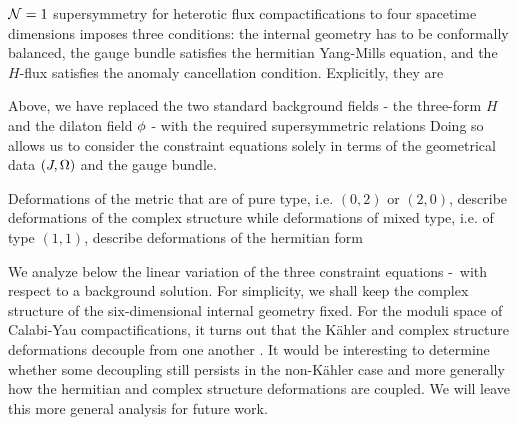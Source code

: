 ${\cal N}=1$ supersymmetry for heterotic flux compactifications to
four spacetime dimensions imposes three conditions: the internal
geometry has to be conformally balanced, the gauge bundle
satisfies the hermitian Yang-Mills equation, and the $H$-flux
satisfies the anomaly cancellation condition. Explicitly, they are
\eqn{}
\eqn{}
\eqn{}

Above, we have replaced the two standard background
fields - the three-form $H$ and the dilaton field $\phi$ - with the
required supersymmetric relations
\eqn{}
\eqn{}
Doing so allows us to consider the constraint equations solely
in terms of the geometrical data $(J, \Omega)$ and the gauge bundle.

Deformations of the metric that are of pure type, i.e. $(0,2)$ or
$(2,0)$, describe deformations of the complex structure
\eqn{} while deformations of mixed
type, i.e. of type $(1,1)$, describe deformations of the hermitian
form \eqn{}


We analyze below the linear variation of the three constraint
equations \balance-\anomcan\ with respect to a background
solution. For simplicity, we shall keep the complex structure of
the six-dimensional internal geometry fixed. For the moduli space
of Calabi-Yau compactifications, it turns out that the K\"ahler
and complex structure deformations decouple from one another
\Candelas. It would be interesting to determine whether some
decoupling still persists in the non-K\"ahler case and more
generally how the hermitian and complex structure deformations are
coupled. We will leave this more general analysis for future work.









